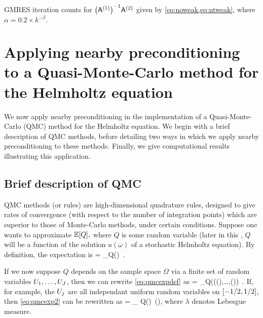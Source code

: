 \begin{table}
  \centering
  
  \caption[GMRES iteration counts when $\NLqDRR{\nso-\nst} = 0.2\times k^{-\beta},$ for any $1 \leq q < \infty$ and $\beta = 0,0.1,\ldots,1$.]{GMRES iteration counts for $\AmatoI\Amatt$ given by \cref{eq:noweak,eq:ntweak}, where $\alpha = 0.2\times k^{-\beta}.$}\label{tab:l1}
  \end{table}



\section[Applying nearby preconditioning to QMC]{Applying nearby preconditioning to a Quasi-Monte-Carlo method for the Helmholtz equation}\label{sec:nbpcqmc}

We now apply nearby preconditioning in the implementation of a Quasi-Monte-Carlo (QMC) method for the Helmholtz equation. We begin with a brief description of QMC methods, before detailing two ways in which we apply nearby preconditioning to these methods. Finally, we give computational results illustrating this application.

\subsection{Brief description of QMC}

QMC methods (or rules) are high-dimensional quadrature rules, designed to give rates of convergence (with respect to the number of integration points) which are superior to those of Monte-Carlo methods, under certain conditions. Suppose one wants to approximate $\EXP{Q},$ where $Q$ is some random variable (later in this , $Q$ will be a function of the solution $u(\omega)$ of a stochastic Helmholtz equation). By definition, the expectation is
\beq\label{eq:qmcexpdef}
 = \int_\Omega Q(\omega)\ \ddPPomega.
\eeq

If we now suppose $Q$ depends on the sample space $\Omega$ via a finite set of random variables $U_{1},\ldots,U_{J}$, then we can rewrite \cref{eq:qmcexpdef} as
\beq\label{eq:qmcexp2}
 = \int_\Omega Q\mleft((\Uo(\omega),\ldots,\UJ(\omega)\mright)\, \ddPPomega.
\eeq
If, for example, the $U_{j}$ are all independant uniform random variables on $\mleft[-1/2,1/2\mright]$, then \cref{eq:qmcexp2} can be rewritten as
\beq\label{eq:qmcexp3}
 = \int_{} \hspace{-3em}Q\mleft(\by\mright)\, \dd\lambda(\by),
\eeq
where $\lambda$ denotes Lebesgue measure.

